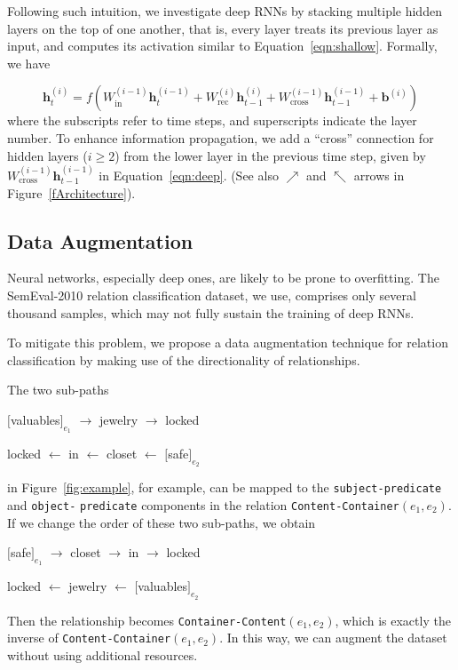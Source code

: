 \documentclass[11pt]{article}
\begin{document}
Following such intuition, we investigate deep RNNs by stacking multiple hidden layers on the top of one another, that is, every layer treats its previous layer as input, and computes its activation similar to Equation~\ref{eqn:shallow}.
Formally, we have

\begin{equation}
\bm h_t^{(i)}=f(W_{\text{in}}^{(i-1)}\bm h_t^{(i-1)} + W_{\text{rec}}^{(i)}\bm h_{t-1}^{(i)}
       + W_\text{cross}^{(i-1)}\bm h_{t-1}^{(i-1)} + \bm b^{(i)})\label{eqn:deep}
\end{equation}
where the subscripts refer to time steps, and superscripts indicate the layer number.
To enhance information propagation, we add a ``cross'' connection for hidden layers ($i\ge 2$) from the lower layer in the previous time step, given by $W_\text{cross}^{(i-1)}\bm h_{t-1}^{(i-1)}$ in Equation~\ref{eqn:deep}. (See also $\nearrow$ and  $\nwarrow$ arrows in Figure~\ref{fArchitecture}).





\bigskip
\subsection{Data Augmentation}\label{ssDataAug}
Neural networks, especially deep ones, are likely to be prone to overfitting. The SemEval-2010 relation classification dataset, we use, comprises only several thousand samples, which may not fully sustain the training of deep RNNs.

To mitigate this problem, we propose a data augmentation technique for relation classification by making use of the directionality of relationships.

The two sub-paths
\begin{compactitem}
\item[] $[$valuables$]_{e_1}$ $\rightarrow$ jewelry $\rightarrow$  locked
\item[] locked $\leftarrow$ in $\leftarrow$ closet $\leftarrow$ $[$safe$]_{e_2}$
\end{compactitem}
in Figure~\ref{fig:example}, for example, can be mapped to the {\tt subject-predicate} and
{\tt object-} {\tt predicate} components in the relation {\tt Content-}{\tt Container}$(e_1,e_2)$. If we change the order of these two sub-paths, we obtain
\begin{compactitem}
\item[] $[$safe$]_{e_1}$ $\rightarrow$ closet $\rightarrow$ in $\rightarrow$ locked
\item[] locked $\leftarrow$ jewelry $\leftarrow$ $[$valuables$]_{e_2}$
\end{compactitem}
Then the relationship becomes {\tt Container-}{\tt Content}$(e_1,e_2)$, which is exactly the inverse of {\tt Content-}{\tt Container}$(e_1,e_2)$. In this way, we can augment the dataset without using additional resources.
\end{document}

